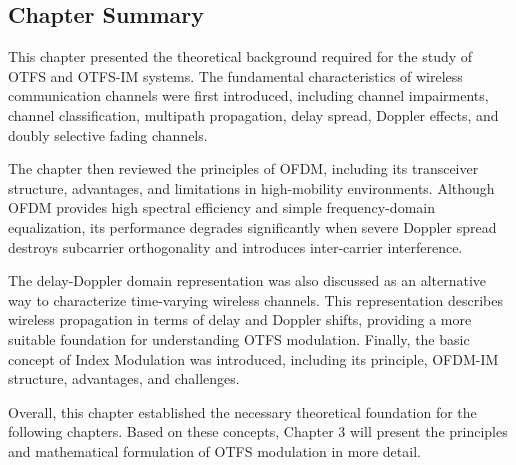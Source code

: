 \subsection{Chapter Summary}

This chapter presented the theoretical background required for the study of OTFS and OTFS-IM systems. The fundamental characteristics of wireless communication channels were first introduced, including channel impairments, channel classification, multipath propagation, delay spread, Doppler effects, and doubly selective fading channels.

The chapter then reviewed the principles of OFDM, including its transceiver structure, advantages, and limitations in high-mobility environments. Although OFDM provides high spectral efficiency and simple frequency-domain equalization, its performance degrades significantly when severe Doppler spread destroys subcarrier orthogonality and introduces inter-carrier interference.

The delay-Doppler domain representation was also discussed as an alternative way to characterize time-varying wireless channels. This representation describes wireless propagation in terms of delay and Doppler shifts, providing a more suitable foundation for understanding OTFS modulation. Finally, the basic concept of Index Modulation was introduced, including its principle, OFDM-IM structure, advantages, and challenges.

Overall, this chapter established the necessary theoretical foundation for the following chapters. Based on these concepts, Chapter 3 will present the principles and mathematical formulation of OTFS modulation in more detail.

\newpage